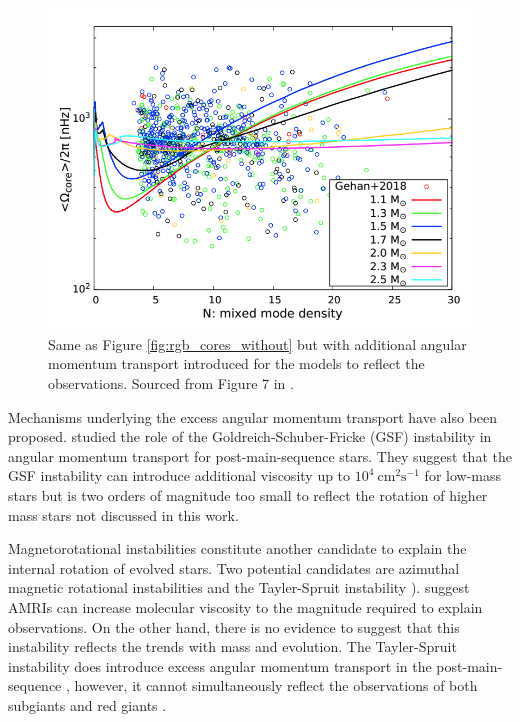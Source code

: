 \begin{figure}[h]
    \includegraphics[width=\textwidth]{Figures/intro_figures/rgb_core_rot.png}
    \caption[Average core rotation rates of red giants against mixed mode density without additional angular momentum transport]{Same as Figure \ref{fig:rgb_cores_without} but with additional angular momentum transport introduced for the models to reflect the observations.
    Sourced from Figure 7 in \citet{moyano_asteroseismology_2022}.}
    \label{fig:rgb_cores_with}
\end{figure}


Mechanisms underlying the excess angular momentum transport have also been proposed.
\citet{barker_angular_2019,barker_angular_2020} studied the role of the Goldreich-Schuber-Fricke (GSF) instability \citep{goldreich_differential_1967,fricke_rotation_1967} in angular momentum transport for post-main-sequence stars.
They suggest that the GSF instability can introduce additional viscosity up to $10^4 \ \text{cm}^2 \text{s}^{-1}$ for low-mass stars but is two orders of magnitude too small to reflect the rotation of higher mass stars not discussed in this work.

Magnetorotational instabilities constitute another candidate to explain the internal rotation of evolved stars.
Two potential candidates are azimuthal magnetic rotational instabilities  and the Tayler-Spruit instability \citep[see ][]{spruit_dynamo_2002}).
\citet{rudiger_diffusive_2015} suggest AMRIs can increase molecular viscosity to the magnitude required to explain observations.
On the other hand, there is no evidence to suggest that this instability reflects the trends with mass and evolution.
The Tayler-Spruit instability does introduce excess angular momentum transport in the post-main-sequence \citep{fuller_slowing_2019}, however, it cannot simultaneously reflect the observations of both subgiants and red giants \citep{eggenberger_asteroseismology_2019,den_hartogh_constraining_2019}.

